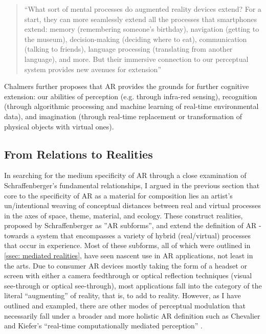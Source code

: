 \begin{quote}
    “What sort of mental processes do augmented reality devices extend? For a start, they can more seamlessly extend all the processes that smartphones extend: memory (remembering someone’s birthday), navigation (getting to the museum), decision-making (deciding where to eat), communication (talking to friends), language processing (translating from another language), and more. But their immersive connection to our perceptual system provides new avenues for extension” \citep[p. 299]{chalmers2022}
\end{quote}
Chalmers further proposes that AR provides the grounds for further cognitive extension: our abilities of perception (e.g. through infra-red sensing), recognition (through algorithmic processing and machine learning of real-time environmental data), and imagination (through real-time replacement or transformation of physical objects with virtual ones).

\subsection{From Relations to Realities}
In searching for the medium specificity of AR through a close examination of Schraffenberger’s fundamental relationships, I argued in the previous section that core to the specificity of AR as a material for composition lies an artist’s un/intentional weaving of conceptual distances between real and virtual processes in the axes of space, theme, material, and ecology. These construct realities, proposed by Schraffenberger as ”AR subforms”, and extend the definition of AR - towards a system that encompasses a variety of hybrid (real/virtual) processes that occur in experience. Most of these subforms, all of which were outlined in \autoref{ssec: mediated realities}, have seen nascent use in AR applications, not least in the arts. Due to consumer AR devices mostly taking the form of a headset or screen with either a camera feedthrough or optical reflection techniques (visual see-through or optical see-through), most applications fall into the category of the literal “augmenting” of reality, that is, to add to reality. However, as I have outlined and exampled, there are other modes of perceptual modulation that necessarily fall under a broader and more holistic AR definition such as Chevalier and Kiefer’s “real-time computationally mediated perception” \citeyearpar[]{chevalier2020}.

